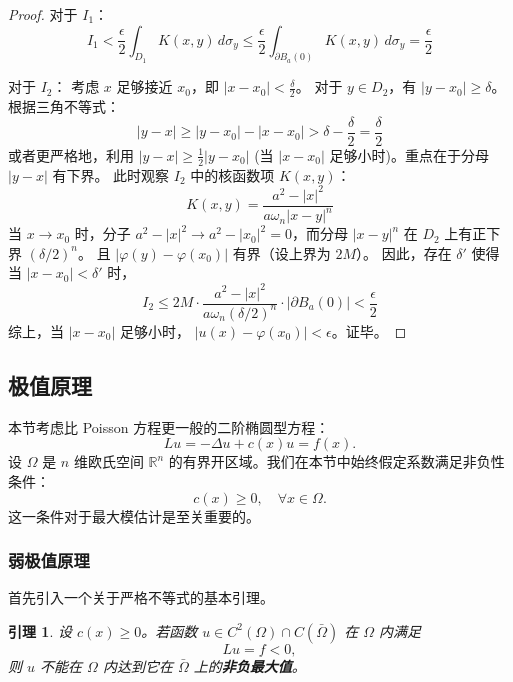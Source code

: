 \documentclass[12pt,a4paper]{ctexart}
\newtheorem{lemma}[theorem]{引理}
\begin{document}
\begin{proof}
		对于 $I_1$：
		\[
		I_1 < \frac{\epsilon}{2} \int_{D_1} K(x, y) \, d\sigma_y \le \frac{\epsilon}{2} \int_{\partial B_a(0)} K(x, y) \, d\sigma_y = \frac{\epsilon}{2}
		\]
		
		对于 $I_2$：
		考虑 $x$ 足够接近 $x_0$，即 $|x - x_0| < \frac{\delta}{2}$。
		对于 $y \in D_2$，有 $|y - x_0| \ge \delta$。根据三角不等式：
		\[
		|y - x| \ge |y - x_0| - |x - x_0| > \delta - \frac{\delta}{2} = \frac{\delta}{2}
		\]
		或者更严格地，利用 $|y-x| \ge \frac{1}{2}|y-x_0|$ (当 $|x-x_0|$ 足够小时)。重点在于分母 $|y-x|$ 有下界。
		此时观察 $I_2$ 中的核函数项 $K(x, y)$：
		\[
		K(x, y) = \frac{a^2 - |x|^2}{a \omega_n |x-y|^n}
		\]
		当 $x \to x_0$ 时，分子 $a^2 - |x|^2 \to a^2 - |x_0|^2 = 0$，而分母 $|x-y|^n$ 在 $D_2$ 上有正下界 $(\delta/2)^n$。
		且 $|\varphi(y) - \varphi(x_0)|$ 有界（设上界为 $2M$）。
		因此，存在 $\delta'$ 使得当 $|x - x_0| < \delta'$ 时，
		\[
		I_2 \le 2M \cdot \frac{a^2 - |x|^2}{a \omega_n (\delta/2)^n} \cdot |\partial B_a(0)| < \frac{\epsilon}{2}
		\]
		综上，当 $|x - x_0|$ 足够小时， $|u(x) - \varphi(x_0)| < \epsilon$。证毕。
	\end{proof}
	
	\subsection{极值原理}
	
	本节考虑比 Poisson 方程更一般的二阶椭圆型方程：
	\begin{equation}
		Lu = -\Delta u + c(x)u = f(x). \label{eq:Lu}
	\end{equation}
	设 $\Omega$ 是 $n$ 维欧氏空间 $\mathbb{R}^n$ 的有界开区域。我们在本节中始终假定系数满足非负性条件：
	\begin{equation}
		c(x) \ge 0, \quad \forall x \in \Omega.
	\end{equation}
	这一条件对于最大模估计是至关重要的。
	
	\subsubsection{弱极值原理}
	
	首先引入一个关于严格不等式的基本引理。
	
	\begin{lemma} \label{lemma:strict_max}
		设 $c(x) \ge 0$。若函数 $u \in C^2(\Omega) \cap C(\bar{\Omega})$ 在 $\Omega$ 内满足
		\begin{equation}
			Lu = f < 0,
		\end{equation}
		则 $u$ 不能在 $\Omega$ 内达到它在 $\bar{\Omega}$ 上的\textbf{非负最大值}。
	\end{lemma}
	
\end{document}
